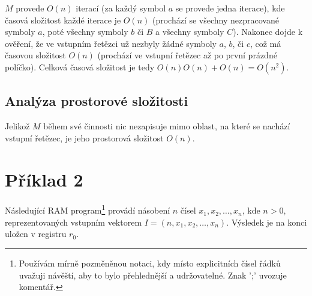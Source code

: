 \documentclass[10pt,a4paper]{article}
\begin{document}
$M$ provede $O(n)$ iterací (za každý symbol $a$ se provede jedna iterace), kde časová složitost každé iterace je $O(n)$ (prochází se všechny nezpracované symboly $a$, poté všechny symboly $b$ či $B$ a všechny symboly $C$). Nakonec dojde k ověření, že ve vstupním řetězci už nezbyly žádné symboly $a$, $b$, či $c$, což má časovou složitost $O(n)$ (prochází ve vstupní řetězec až po první prázdné políčko). Celková časová složitost je tedy $O(n)O(n) + O(n) = O(n^{2})$.

\subsection*{Analýza prostorové složitosti}

Jelikož $M$ během své činnosti nic nezapisuje mimo oblast, na které se nachází vstupní řetězec, je jeho prostorová složitost $O(n)$.

\pagebreak
\section*{Příklad 2}

Následující RAM program\footnote{Používám mírně pozměněnou notaci, kdy místo explicitních čísel řádků uvažuji návěští, aby to bylo přehlednější a udržovatelné. Znak ';' uvozuje komentář.} provádí násobení $n$ čísel $x_{1}, x_{2}, \dots, x_{n}$, kde $n > 0$, reprezentovaných vstupním vektorem $I = (n, x_{1}, x_{2}, \dots, x_{n})$. Výsledek je na konci uložen v registru $r_{0}$.
\end{document}
